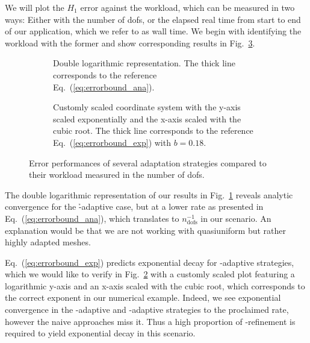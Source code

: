 We will plot the $H_1$ error against the workload, which can be measured in two ways: Either with the number of \glspl{dof}, or the elapsed real time from start to end of our application, which we refer to as wall time. We begin with identifying the workload with the former and show corresponding results in Fig.~\ref{fig:errordofs}.


\begin{figure}
\begin{subfigure}{1\textwidth}
  \centering
  \caption{Double logarithmic representation. The thick line corresponds to the reference Eq.~(\ref{eq:errorbound_ana}).}
  \label{fig:errordofsloglog}
\end{subfigure}
\begin{subfigure}{1\textwidth}
  \centering
  \caption{Customly scaled coordinate system with the y-axis scaled exponentially and the x-axis scaled with the cubic root. The thick line corresponds to the reference Eq.~(\ref{eq:errorbound_exp}) with $b = 0.18$.}
  \label{fig:errordofscustom}
\end{subfigure}
\caption{Error performances of several adaptation strategies compared to their workload measured in the number of \glspl{dof}.}
\label{fig:errordofs}
\end{figure}

The double logarithmic representation of our results in Fig.~\ref{fig:errordofsloglog} reveals analytic convergence for the \h-adaptive case, but at a lower rate as presented in Eq.~(\ref{eq:errorbound_ana}), which translates to $n_\text{dofs}^{-1}$ in our scenario. An explanation would be that we are not working with quasiuniform but rather highly adapted meshes.

Eq.~(\ref{eq:errorbound_exp}) predicts exponential decay for \hp-adaptive strategies, which we would like to verify in Fig.~\ref{fig:errordofscustom} with a customly scaled plot featuring a logarithmic y-axis and an x-axis scaled with the cubic root, which corresponds to the correct exponent in our numerical example. Indeed, we see exponential convergence in the \p-adaptive and \hp-adaptive strategies to the proclaimed rate, however the naive approaches miss it. Thus a high proportion of \p-refinement is required to yield exponential decay in this scenario.


